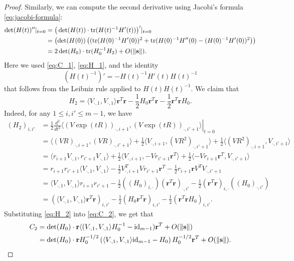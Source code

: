 \documentclass[11pt,oneside]{amsart}
\numberwithin{equation}{section}
\theoremstyle{remark}
\theoremstyle{plain}
\DeclareMathOperator{\tr}{tr}
\newcommand\id{\mathrm{id}}
\newcommand{\br}{\mathbf{r}}
\newcommand{\mbs}{\mathbf{s}}
\renewcommand\leq{\leqslant}
\begin{document}
\begin{proof}
Similarly, we can compute the second derivative using Jacobi's formula \eqref{eq:jacobi-formula}:
\begin{align}
\notag \det(H(t))''|_{t=0} & = \big(\det(H(t)) \cdot \tr(H(t)^{-1} H'(t))\big)'|_{t=0}
\\ \notag & = \left(\det(H(0)) \left((\tr(H(0)^{-1}H'(0))^2 + \tr(H(0)^{-1}H''(0)-(H(0)^{-1}H'(0))^2\right)\right)
\\ \label{eq:C_2} & = 2 \det(H_0) \cdot \tr(H_0^{-1} H_2) + O(\|\mbs\|).
\end{align}
Here we used \eqref{eq:C_1}, \eqref{eq:H_1}, and the identity
\[
(H(t)^{-1})' = -H(t)^{-1} H'(t) H(t)^{-1}
\]
that follows from the Leibniz rule applied to $H(t)H(t)^{-1}$. We claim that
\begin{equation}\label{eq:H_2}
H_2=\langle V_{\cdot,1}, V_{\cdot,1} \rangle \br^T \br - \frac{1}{2} H_0 \br^T \br - \frac{1}{2} \br^T \br H_0.
\end{equation}
Indeed, for any $1\leq i,i'\leq m-1$, we have 
\begin{align*}
(H_2)_{i,i'}&=\frac{1}{2}\left.\frac{d^2}{dt^2}\langle (V\exp(tR))_{\cdot,i+1}, (V\exp(tR))_{\cdot,i'+1} \rangle \right|_{t=0}
\\ &= \langle (VR)_{\cdot,i+1}, (VR)_{\cdot,i'+1} \rangle + \frac{1}{2} \langle V_{\cdot,i+1}, (VR^2)_{\cdot,i'+1} \rangle + \frac{1}{2} \langle (VR^2)_{\cdot,i+1}, V_{\cdot,i'+1} \rangle
\\ & = \langle r_{i+1} V_{\cdot, 1}, r_{i'+1} V_{\cdot,1} \rangle + \frac{1}{2} \langle V_{\cdot,i+1}, - V r_{i'+1} \br^T \rangle + \frac{1}{2} \langle - V r_{i+1} \br^T, V_{\cdot,i'+1} \rangle
\\ & = r_{i+1} r_{i'+1} \langle V_{\cdot,1},V_{\cdot,1}\rangle - \frac{1}{2} V_{\cdot,i+1}^T V r_{i'+1} \br^T - \frac{1}{2} r_{i+1} \br V^T V_{\cdot,i'+1} 
\\ & = \langle V_{\cdot,1},V_{\cdot,1}\rangle r_{i+1} r_{i'+1} - \frac{1}{2} ((H_0)_{i,\cdot}) (\br^T \br)_{\cdot,i'} - \frac{1}{2} (\br^T \br)_{i,\cdot} ((H_0)_{\cdot,i'})
\\ & = (\langle V_{\cdot,1},V_{\cdot,1}\rangle \br^T \br)_{i,i'} - \frac{1}{2} ( H_0 \br^T \br)_{i,i'} - \frac{1}{2} (\br^T \br H_0)_{i,i'}.
\end{align*}
Substituting \eqref{eq:H_2} into \eqref{eq:C_2}, we get that
\begin{align}
\notag C_2 & = \det(H_0) \cdot \br \langle (V_{\cdot,1},V_{\cdot,1}\rangle H_0^{-1} -\id_{m-1})\br^T + O(\|\mbs\|)
\\ \label{eq:C_2-result} & = \det(H_0) \cdot \br H_0^{-1/2} \left( \langle V_{\cdot,1},V_{\cdot,1} \rangle \id_{m-1} - H_0\right) H_0^{-1/2} \br^T + O(\|\mbs\|).
\end{align}


\end{proof}
\end{document}
